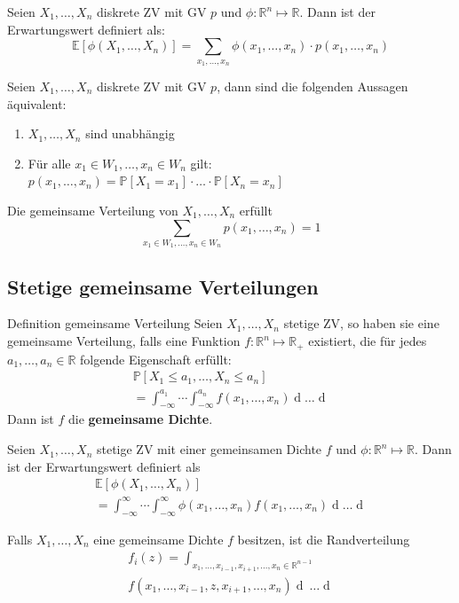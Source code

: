 \documentclass[a4paper,10pt]{article}
\def\R{\mathbb{R}}
\def\P{\mathbb{P}}
\def\E{\mathbb{E}}
\begin{document}
Seien \(X_1,\ldots,X_n\) diskrete ZV mit GV \(p\) und \(\phi : \R^n \mapsto \R\). Dann ist der Erwartungswert definiert als:
\[\E[\phi(X_1, \ldots, X_n)] = \sum_{x_1,\ldots,x_n} \phi(x_1,\ldots,x_n) \cdot p(x_1,\ldots,x_n)\]

Seien \(X_1,\ldots,X_n\) diskrete ZV mit GV \(p\), dann sind die folgenden Aussagen äquivalent:
\begin{enumerate}
	\item \(X_1,\ldots,X_n\) sind unabhängig
	\item Für alle \(x_1 \in W_1, \ldots, x_n \in W_n\) gilt:
	      \(p(x_1,\ldots,x_n) = \P[X_1 = x_1] \cdot \ldots \cdot \P[X_n = x_n]\)
\end{enumerate}

Die gemeinsame Verteilung von \(X_1, \ldots, X_n\) erfüllt
\[\sum_{x_1\in W_1, \ldots, x_n \in W_n} p(x_1, \ldots, x_n) = 1\]

\subsection{Stetige gemeinsame Verteilungen}
\begin{subbox}{Definition gemeinsame Verteilung}
	Seien \(X_1, \ldots, X_n\) stetige ZV, so haben sie eine gemeinsame Verteilung, falls eine Funktion \(f: \R^n \mapsto \R_+\) existiert, die für jedes \(a_1, \ldots, a_n \in \R\) folgende Eigenschaft erfüllt:
	\begin{align*}
		\P[X_1 \le a_1, \ldots, X_n \le a_n] \\= \int_{-\infty}^{a_1} \cdots \int_{-\infty}^{a_n} f(x_1, \ldots, x_n) \mathop{dx_n} \ldots \mathop{dx_1}
	\end{align*}
	Dann ist \(f\) die \textbf{gemeinsame Dichte}.
\end{subbox}

Seien \(X_1, \ldots, X_n\) stetige ZV mit einer gemeinsamen Dichte \(f\) und \(\phi: \R^n \mapsto \R\). Dann ist der Erwartungswert definiert als
\begin{align*}
	\E[\phi(X_1, \ldots, X_n)] \\= \int_{-\infty}^\infty \cdots \int_{-\infty}^\infty \phi(x_1, \ldots, x_n) f(x_1, \ldots, x_n) \mathop{dx_n} \ldots \mathop{dx_1}
\end{align*}

Falls \(X_1, \ldots, X_n\) eine gemeinsame Dichte \(f\) besitzen, ist die Randverteilung
\begin{align*}
	f_i(z) = \int_{x_1, \ldots, x_{i-1}, x_{i+1}, \ldots, x_n \in \R^{n-1}}               \\
	f(x_1, \ldots, x_{i-1}, z, x_{i+1}, \ldots, x_n) \mathop{dx_n} \ \ldots \mathop{dx_1} \\
\end{align*}
\end{document}
